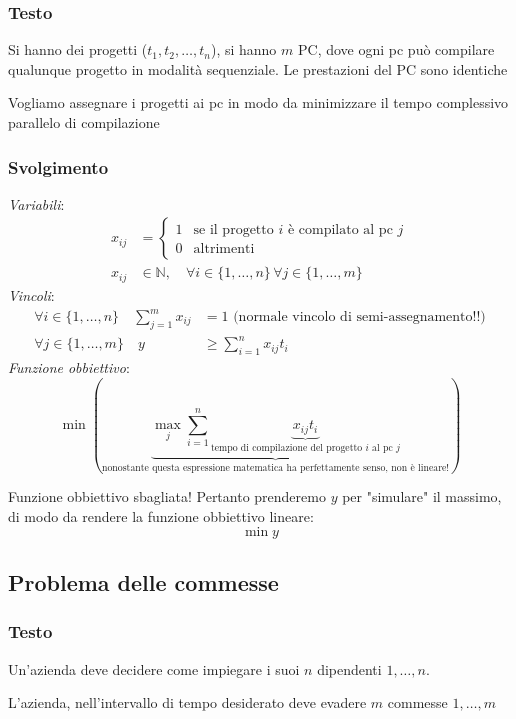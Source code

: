 \subsubsection{Testo}
Si hanno dei progetti ($t_1, t_2, \dots, t_n$), si hanno $m$ PC, dove ogni pc può compilare qualunque progetto in modalità sequenziale. Le prestazioni del PC sono identiche 

Vogliamo assegnare i progetti ai pc in modo da minimizzare il tempo complessivo parallelo di compilazione
\subsubsection{Svolgimento}
\textit{Variabili}:
\[
    \begin{aligned}
        x_{ij} &= \begin{cases}
            1 & \text{se il progetto $i$ è compilato al pc $j$} \\
            0 & \text{altrimenti}
        \end{cases}\\
        x_{ij}&\in \mathbb{N}, \quad \forall i\in \{1,\dots, n\}\,\forall j\in \{1,\dots, m\} \
    \end{aligned}
\]
\textit{Vincoli}:
\[
    \begin{aligned}
        \forall i\in\{1,\dots,n\}\quad \sum_{j=1}^{m}x_{ij} &= 1 \text{ (normale vincolo di semi-assegnamento!!)}\\
        \forall j\in\{1,\dots,m\}\quad y&\geq \sum^n_{i=1}x_{ij}t_i 
    \end{aligned}
\]
\textit{Funzione obbiettivo}:
\[
    \min (\underbrace{{\max_j \sum^n_{i=1}\underbrace{x_{ij}t_i}_{\text{tempo di compilazione del progetto $i$ al pc $j$}}}}_{\text{nonostante questa espressione matematica ha perfettamente senso, non è lineare!}})
\]

Funzione obbiettivo sbagliata! Pertanto prenderemo $y$ per "simulare" il massimo, di modo da rendere la funzione obbiettivo lineare:
\[
    \min y
\]

\subsection{Problema delle commesse}
\subsubsection{Testo}
Un'azienda deve decidere come impiegare i suoi $n$ dipendenti $1,\dots, n$.

L'azienda, nell'intervallo di tempo desiderato deve evadere $m$ commesse $1,\dots, m$

